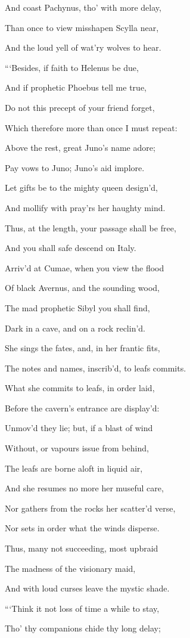 And coast Pachynus, tho’ with more delay,

Than once to view misshapen Scylla near,

And the loud yell of wat’ry wolves to hear.

“‘Besides, if faith to Helenus be due,

And if prophetic Phoebus tell me true,

Do not this precept of your friend forget,

Which therefore more than once I must repeat:

Above the rest, great Juno’s name adore;

Pay vows to Juno; Juno’s aid implore.

Let gifts be to the mighty queen design’d,

And mollify with pray’rs her haughty mind.

Thus, at the length, your passage shall be free,

And you shall safe descend on Italy.

Arriv’d at Cumae, when you view the flood

Of black Avernus, and the sounding wood,

The mad prophetic Sibyl you shall find,

Dark in a cave, and on a rock reclin’d.

She sings the fates, and, in her frantic fits,

The notes and names, inscrib’d, to leafs commits.

What she commits to leafs, in order laid,

Before the cavern’s entrance are display’d:

Unmov’d they lie; but, if a blast of wind

Without, or vapours issue from behind,

The leafs are borne aloft in liquid air,

And she resumes no more her museful care,

Nor gathers from the rocks her scatter’d verse,

Nor sets in order what the winds disperse.

Thus, many not succeeding, most upbraid

The madness of the visionary maid,

And with loud curses leave the mystic shade.

“‘Think it not loss of time a while to stay,

Tho’ thy companions chide thy long delay;

